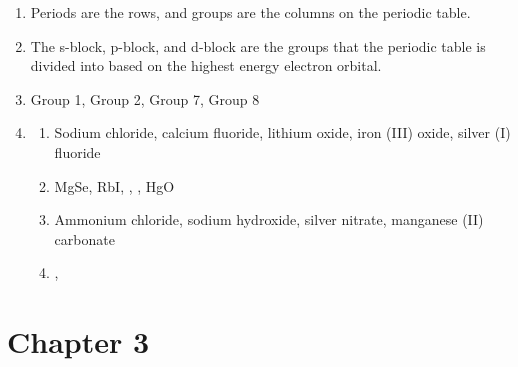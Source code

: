 \documentclass[a4paper, 12pt]{article}
\begin{document}
\begin{enumerate}[label=\alph*.]
\item Periods are the rows, and groups are the columns on the periodic table.
\item The s-block, p-block, and d-block are the groups that the periodic table is divided into based on the highest energy electron orbital.
\item Group 1, Group 2, Group 7, Group 8
\item \begin{enumerate}[label=\roman*.]
\item Sodium chloride, calcium fluoride, lithium oxide, iron (III) oxide, silver (I) fluoride
\item MgSe, RbI, , , HgO
\item Ammonium chloride, sodium hydroxide, silver nitrate, manganese (II) carbonate
\item {}, 
\end{enumerate}
\end{enumerate}

\section{Chapter 3}
\end{document}
